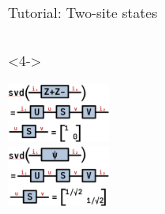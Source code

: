 \begin{frame}[fragile]{Tutorial: Two-site states}
\begin{columns}
\begin{column}{5cm}
\begin{onlyenv}<4->
\vspace*{0.0cm}
\begin{center}
\includegraphics[width=0.2\textwidth]{
  slides/assets/svd_ZpZm12.png
} \\
\includegraphics[width=0.2\textwidth]{
  slides/assets/svd_cat12.png
}
\end{center}
\vspace*{0.0cm}
\end{onlyenv}

\end{column}

\end{columns}

\end{frame}
